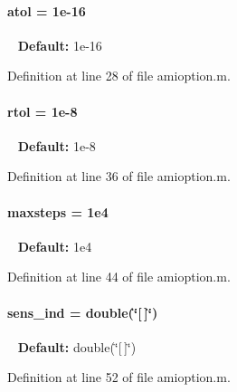 \paragraph[{atol}]{\setlength{\rightskip}{0pt plus 5cm}atol = 1e-\/16}\label{classamioption_a0c5f3dcf809a17b895fe12fc91272349}
~\newline
{\bfseries Default\+:} 1e-\/16 

Definition at line 28 of file amioption.\+m.

\hypertarget{classamioption_a7978e9a4674f869e6b2950e2f6262ca5}{}
\paragraph[{rtol}]{\setlength{\rightskip}{0pt plus 5cm}rtol = 1e-\/8}\label{classamioption_a7978e9a4674f869e6b2950e2f6262ca5}
~\newline
{\bfseries Default\+:} 1e-\/8 

Definition at line 36 of file amioption.\+m.

\hypertarget{classamioption_ac37622882dacee1f11688d4941ccb45e}{}
\paragraph[{maxsteps}]{\setlength{\rightskip}{0pt plus 5cm}maxsteps = 1e4}\label{classamioption_ac37622882dacee1f11688d4941ccb45e}
~\newline
{\bfseries Default\+:} 1e4 

Definition at line 44 of file amioption.\+m.

\hypertarget{classamioption_a0505783cf66f362672cbe3320d47a94d}{}
\paragraph[{sens\+\_\+ind}]{\setlength{\rightskip}{0pt plus 5cm}sens\+\_\+ind = double(\char`\"{}\mbox{[}$\,$\mbox{]}\char`\"{})}\label{classamioption_a0505783cf66f362672cbe3320d47a94d}
~\newline
{\bfseries Default\+:} double(\char`\"{}\mbox{[}$\,$\mbox{]}\char`\"{}) 

Definition at line 52 of file amioption.\+m.

\hypertarget{classamioption_a8938c19fd7067f4780be8255764210b7}{}

